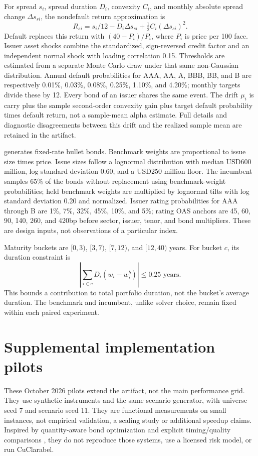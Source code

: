 \documentclass[11pt,a4paper]{article}
\begin{document}
For spread $s_i$, spread duration $D_i$, convexity $C_i$, and monthly
absolute spread change $\Delta s_{si}$, the nondefault return approximation is
\[
 R_{si}=s_i/12-D_i\Delta s_{si}+\tfrac12 C_i(\Delta s_{si})^2.
\]
Default replaces this return with $(40-P_i)/P_i$, where $P_i$ is price per
100 face. Issuer asset shocks combine the standardized, sign-reversed credit
factor and an independent normal shock with loading correlation 0.15.
Thresholds are estimated from a separate Monte Carlo draw under that same
non-Gaussian distribution. Annual default probabilities for AAA, AA, A, BBB,
BB, and B are respectively 0.01\%, 0.03\%, 0.08\%, 0.25\%, 1.10\%, and
4.20\%; monthly targets divide these by 12. Every bond of an issuer shares
the same event. The drift $\mu_i$ is carry plus the sample second-order
convexity gain plus target default probability times default return, not a
sample-mean alpha estimate. Full details and diagnostic disagreements between
this drift and the realized sample mean are retained in the artifact.

 generates fixed-rate bullet bonds. Benchmark weights
are proportional to issue size times price. Issue sizes follow a lognormal
distribution with median USD600 million, log standard deviation 0.60, and a
USD250 million floor. The incumbent samples 65\% of the bonds without
replacement using benchmark-weight probabilities; held benchmark weights are
multiplied by lognormal tilts with log standard deviation 0.20 and normalized.
Issuer rating probabilities for AAA through B are 1\%, 7\%, 32\%, 45\%,
10\%, and 5\%; rating OAS anchors are 45, 60, 90, 140, 260, and 420bp before
sector, issuer, tenor, and bond multipliers. These are design inputs, not
observations of a particular index.

Maturity buckets are $[0,3)$, $[3,7)$, $[7,12)$, and $[12,40)$ years.
For bucket $c$, its duration constraint is
\[
 \left|\sum_{i\in c}D_i(w_i-w_i^b)\right|\leq0.25\text{ years}.
\]
This bounds a contribution to total portfolio duration, not the bucket's
average duration. The benchmark and incumbent, unlike solver choice, remain
fixed within each paired experiment.

\section{Supplemental implementation pilots}\label{app:pilots}

These October 2026 pilots extend the artifact, not the main performance grid.
They use synthetic instruments and the same scenario generator, with universe
seed 7 and scenario seed 11. They are functional measurements on small
instances, not empirical validation, a scaling study or additional speedup
claims. Inspired by quantity-aware bond optimization
\citep{benslimane2023bondmip} and explicit timing/quality comparisons
\citep{ghosh2026prism,chen2024cuclarabel}, they do not reproduce those systems,
use a licensed risk model, or run CuClarabel.
\end{document}
